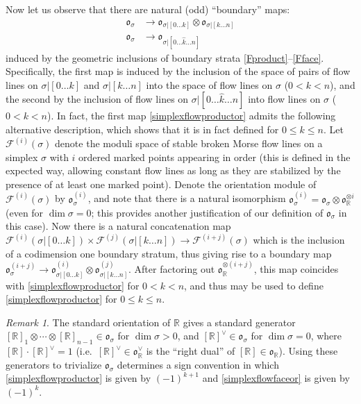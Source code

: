 \documentclass[12pt]{article}
\theoremstyle{definition}
\theoremstyle{remark}
\newtheorem{remark}[theorem]{Remark}
\numberwithin{equation}{subsection}
\newcommand{\F}{\mathcal F}
\newcommand{\oo}{\mathfrak o}
\newcommand{\RR}{\mathbb R}
\begin{document}
Now let us observe that there are natural (odd) ``boundary'' maps:
\begin{align}
\label{simplexflowproductor}\oo_\sigma&\to\oo_{\sigma|[0\ldots k]}\otimes\oo_{\sigma|[k\ldots n]}\\
\label{simplexflowfaceor}\oo_\sigma&\to\oo_{\sigma|[0\ldots\hat k\ldots n]}
\end{align}
induced by the geometric inclusions of boundary strata \eqref{Fproduct}--\eqref{Fface}.  Specifically, the first map is induced by the inclusion of the space of pairs of flow lines on $\sigma|[0\ldots k]$ and $\sigma|[k\ldots n]$ into the space of flow lines on $\sigma$ ($0<k<n$), and the second by the inclusion of flow lines on $\sigma|[0\ldots\hat k\ldots n]$ into flow lines on $\sigma$ ($0<k<n$).  In fact, the first map \eqref{simplexflowproductor} admits the following alternative description, which shows that it is in fact defined for $0\leq k\leq n$.  Let $\F^{(i)}(\sigma)$ denote the moduli space of stable broken Morse flow lines on a simplex $\sigma$ with $i$ ordered marked points appearing in order (this is defined in the expected way, allowing constant flow lines as long as they are stabilized by the presence of at least one marked point).  Denote the orientation module of $\F^{(i)}(\sigma)$ by $\oo_\sigma^{(i)}$, and note that there is a natural isomorphism $\oo_\sigma^{(i)}=\oo_\sigma\otimes\oo_\RR^{\otimes i}$ (even for $\dim\sigma=0$; this provides another justification of our definition of $\oo_\sigma$ in this case).  Now there is a natural concatenation map $\F^{(i)}(\sigma|[0\ldots k])\times\F^{(j)}(\sigma|[k\ldots n])\to\F^{(i+j)}(\sigma)$ which is the inclusion of a codimension one boundary stratum, thus giving rise to a boundary map $\oo_\sigma^{(i+j)}\to\oo_{\sigma|[0\ldots k]}^{(i)}\otimes\oo_{\sigma|[k\ldots n]}^{(j)}$.  After factoring out $\oo_\RR^{\otimes(i+j)}$, this map coincides with \eqref{simplexflowproductor} for $0<k<n$, and thus may be used to define \eqref{simplexflowproductor} for $0\leq k\leq n$.

\begin{remark}
The standard orientation of $\RR$ gives a standard generator $[\RR]_1\otimes\cdots\otimes[\RR]_{n-1}\in\oo_\sigma$ for $\dim\sigma>0$, and $[\RR]^\vee\in\oo_\sigma$ for $\dim\sigma=0$, where $[\RR]\cdot[\RR]^\vee=1$ (i.e.\ $[\RR]^\vee\in\oo_\RR^\vee$ is the ``right dual'' of $[\RR]\in\oo_\RR$).  Using these generators to trivialize $\oo_\sigma$ determines a sign convention in which \eqref{simplexflowproductor} is given by $(-1)^{k+1}$ and \eqref{simplexflowfaceor} is given by $(-1)^k$.
\end{remark}
\end{document}
